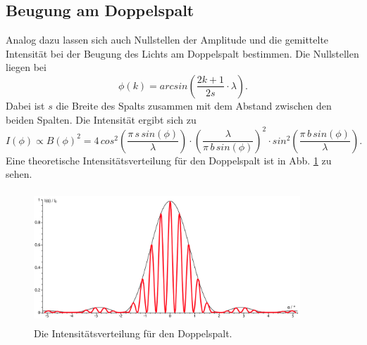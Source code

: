 \subsection{Beugung am Doppelspalt}
Analog dazu lassen sich auch Nullstellen der Amplitude und 
die gemittelte Intensität bei der Beugung des Lichts am 
Doppelspalt bestimmen.
Die Nullstellen liegen bei 
\begin{equation*}
    \phi(k) = arcsin \left(\frac{2k+1}{2s}\cdot \lambda \right).
\end{equation*}
Dabei ist $s$ die Breite des Spalts zusammen mit
dem Abstand zwischen den beiden Spalten.
\newline
Die Intensität ergibt sich zu 
\begin{equation}
    I(\phi) \propto B(\phi)^2 =4 \, cos^2 \left(\frac{\pi \, s \, sin(\phi)}{\lambda} \right)\cdot \left(\frac{\lambda}{\pi \, b \, sin(\phi)} \right)^2 \cdot sin^2 \left(\frac{\pi \, b \, sin(\phi)}{\lambda}\right).
    \label{eqn:doppelspalt}
\end{equation}
Eine theoretische Intensitätsverteilung für den Doppelspalt
ist in Abb. \ref{fig:doppel} zu sehen.
\begin{figure}
    \centering
    \includegraphics[width=10cm, height=5cm]{build/Doppelspalt.png}
    \caption{Die Intensitätsverteilung für den Doppelspalt. \cite{doppel}}
    \label{fig:doppel}
\end{figure}